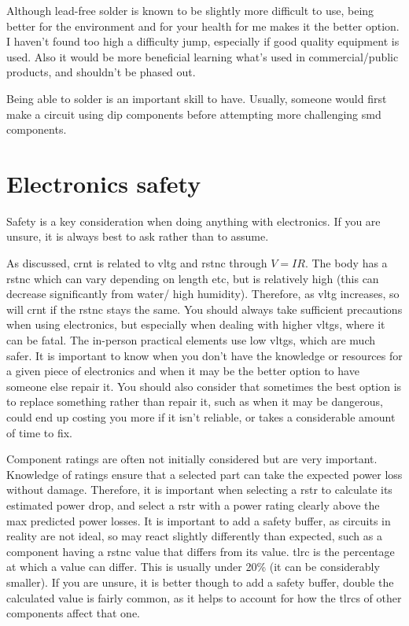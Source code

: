 \documentclass[a4paper,11pt]{report}
\begin{document}
Although lead-free solder is known to be slightly more difficult to use, being better for the environment and for your health for me makes it the better option. I haven't found too high a difficulty jump, especially if good quality equipment is used. Also it would be more beneficial learning what's used in commercial/public products, and shouldn't be phased out.

Being able to solder is an important skill to have. Usually, someone would first make a circuit using \gls{dip} components before attempting more challenging \gls{smd} components.

\pagebreak

\section{Electronics safety}

Safety is a key consideration when doing anything with electronics. If you are unsure, it is always best to ask rather than to assume.

As discussed, \gls{crnt} is related to \gls{vltg} and \gls{rstnc} through $V=IR$. The body has a \gls{rstnc} which can vary depending on length etc, but is relatively high (this can decrease significantly from water/ high humidity). Therefore, as \gls{vltg} increases, so will \gls{crnt} if the \gls{rstnc} stays the same. You should always take sufficient precautions when using electronics, but especially when dealing with higher \gls{vltg}s, where it can be fatal. The in-person practical elements use low \gls{vltg}s, which are much safer. It is important to know when you don't have the knowledge or resources for a given piece of electronics and when it may be the better option to have someone else repair it. You should also consider that sometimes the best option is to replace something rather than repair it, such as when it may be dangerous, could end up costing you more if it isn't reliable, or takes a considerable amount of time to fix.

Component ratings are often not initially considered but are very important. Knowledge of ratings ensure that a selected part can take the expected power loss without damage. Therefore, it is important when selecting a \gls{rstr} to calculate its estimated power drop, and select a \gls{rstr} with a power rating clearly above the max predicted power losses. It is important to add a safety buffer, as circuits in reality are not ideal, so may react slightly differently than expected, such as a component having a \gls{rstnc} value that differs from its value.
\gls{tlrc} is the percentage at which a value can differ. This is usually under 20\% (it can be considerably smaller). If you are unsure, it is better though to add a safety buffer, double the calculated value is fairly common, as it helps to account for how the \gls{tlrc}s of other components affect that one.
\end{document}
